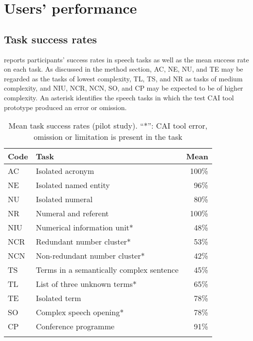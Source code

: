 \section{Users' performance}


\subsection{Task success rates}

 reports participants’ success rates in speech tasks as well as the mean success rate on each task. As discussed in the method section, AC, NE, NU, and TE may be regarded as the tasks of lowest complexity, TL, TS, and NR as tasks of medium complexity, and NIU, NCR, NCN, SO, and CP may be expected to be of higher complexity. An asterisk identifies the speech tasks in which the test CAI tool prototype produced an error or omission.

\begin{table}
\begin{tabular}{llr}
\lsptoprule
{Code} & {Task}                         & {Mean} \\
\midrule
{AC}            & {Isolated acronym}                      & {100\%}         \\
{NE}            & {Isolated named entity}                 & {96\%}          \\
{NU}            & {Isolated numeral}                      & {80\%}          \\
{NR}            & {Numeral and referent}                    & {100\%}         \\
{NIU}           & {Numerical information unit*}            & {48\%}         \\
{NCR}           & {Redundant number cluster*}              & {53\%}         \\
{NCN}           & {Non-redundant number cluster*}          & {42\%}         \\
{TS}            & {Terms in a semantically complex sentence} & {45\%}          \\
{TL}            & {List of three unknown terms*}           & {65\%}         \\
{TE}            & {Isolated term}                         & {78\%}          \\
{SO}            & {Complex speech opening*}                & {78\%}         \\
{CP}            & {Conference programme}                  & {91\%}          \\
\lspbottomrule
\end{tabular}
\caption{Mean task success rates (pilot study). “*”: CAI tool error, omission or limitation is present in the task}
\label{tab:14}
\end{table}

